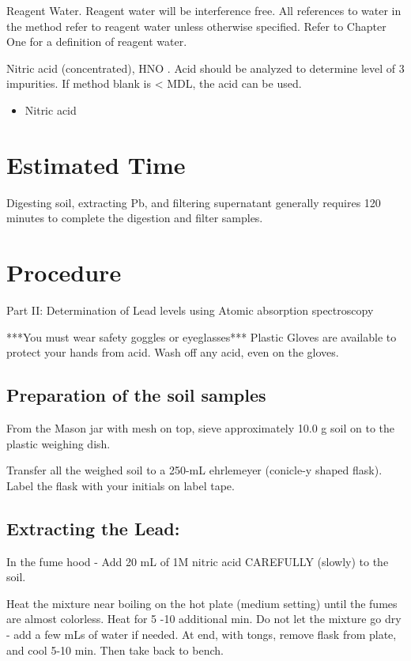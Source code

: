 \documentclass[12pt]{../SOP3_alpha}
\begin{document}
\NP Reagent Water. Reagent water will be interference free. All references to water in
the method refer to reagent water unless otherwise specified. Refer to Chapter One for a definition
of reagent water.

\NP Nitric acid (concentrated), HNO . Acid should be analyzed to determine level of 3
impurities. If method blank is < MDL, the acid can be used. 

\begin{itemize}
  \item Nitric acid
\end{itemize}

\section{Estimated Time}

\NP Digesting soil, extracting Pb, and filtering supernatant  generally requires 120 minutes to complete the digestion and filter samples.

\section{Procedure}
\NP Part II: Determination of Lead levels using Atomic absorption spectroscopy

***You must wear safety goggles or eyeglasses***
Plastic Gloves are available to protect your hands from acid. Wash off any acid, even on the gloves.

\subsection{Preparation of the soil samples}

\NP From the Mason jar with mesh on top, sieve approximately 10.0 g soil on to the plastic weighing dish.

\NP Transfer all the weighed soil to a 250-mL ehrlemeyer (conicle-y shaped flask). Label the flask with your initials on label tape. 

\subsection{Extracting the Lead:}

\NP In the fume hood - Add 20 mL of 1M nitric acid CAREFULLY (slowly) to the soil.

\NP Heat the mixture near boiling on the hot plate (medium setting) until the fumes are almost colorless. Heat for 5 -10 additional min. Do not let the mixture go dry - add a few mLs of water if needed. At end, with tongs, remove flask from plate, and cool 5-10 min. Then take back to bench.
\end{document}

